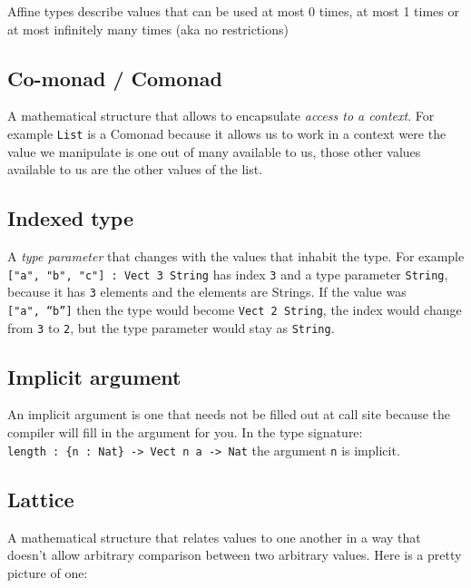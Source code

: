 \documentclass[
]{article}
\begin{document}
Affine types describe values that can be used at most 0 times, at most 1
times or at most infinitely many times (aka no restrictions)

\hypertarget{co-monad-comonad}{%
\subsection{Co-monad / Comonad}\label{co-monad-comonad}}

A mathematical structure that allows to encapsulate \emph{access to a
context}. For example \texttt{List} is a Comonad because it allows us to
work in a context were the value we manipulate is one out of many
available to us, those other values available to us are the other values
of the list.

\hypertarget{indexed-type}{%
\subsection{Indexed type}\label{indexed-type}}

A \emph{type parameter} that changes with the values that inhabit the
type. For example \texttt{{[}"a",\ "b",\ "c"{]}\ :\ Vect\ 3\ String} has
index \texttt{3} and a type parameter \texttt{String}, because it has
\texttt{3} elements and the elements are Strings. If the value was
\texttt{{[}\textasciigrave{}"a",\ “b”{]}} then the type would become
\texttt{Vect\ 2\ String}, the index would change from \texttt{3} to
\texttt{2}, but the type parameter would stay as \texttt{String}.

\hypertarget{implicit-argument}{%
\subsection{Implicit argument}\label{implicit-argument}}

An implicit argument is one that needs not be filled out at call site
because the compiler will fill in the argument for you. In the type
signature:
\texttt{length\ :\ \{n\ :\ Nat\}\ -\textgreater{}\ Vect\ n\ a\ -\textgreater{}\ Nat}
the argument \texttt{n} is implicit.

\hypertarget{lattice}{%
\subsection{Lattice}\label{lattice}}

A mathematical structure that relates values to one another in a way
that doesn't allow arbitrary comparison between two arbitrary values.
Here is a pretty picture of one:
\end{document}

